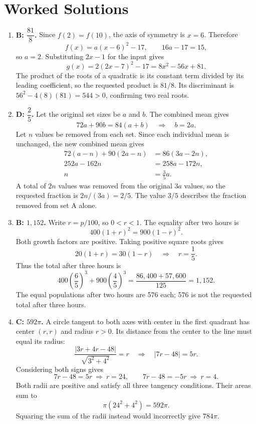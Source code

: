 \documentclass[12pt]{article}
\begin{document}
\section*{Worked Solutions}
\begin{enumerate}[leftmargin=*,itemsep=1em]
  \item \textbf{B: $\dfrac{81}{8}$.} Since $f(2)=f(10)$, the axis of symmetry is $x=6$. Therefore
  \[
    f(x)=a(x-6)^2-17,\qquad 16a-17=15,
  \]
  so $a=2$. Substituting $2x-1$ for the input gives
  \[
    g(x)=2(2x-7)^2-17=8x^2-56x+81.
  \]
  The product of the roots of a quadratic is its constant term divided by its leading coefficient, so the requested product is $\boxed{81/8}$. Its discriminant is $56^2-4(8)(81)=544>0$, confirming two real roots.

  \vfill
  \item \textbf{D: $\dfrac25$.} Let the original set sizes be $a$ and $b$. The combined mean gives
  \[
    72a+90b=84(a+b)\quad\Longrightarrow\quad b=2a.
  \]
  Let $n$ values be removed from each set. Since each individual mean is unchanged, the new combined mean gives
  \begin{align*}
    72(a-n)+90(2a-n)&=86(3a-2n),\\
    252a-162n&=258a-172n,\\
    n&=\frac35a.
  \end{align*}
  A total of $2n$ values was removed from the original $3a$ values, so the requested fraction is $2n/(3a)=\boxed{2/5}$. The value $3/5$ describes the fraction removed from set A alone.

  \vfill
  \newpage
  \item \textbf{B: $1{,}152$.} Write $r=p/100$, so $0<r<1$. The equality after two hours is
  \[
    400(1+r)^2=900(1-r)^2.
  \]
  Both growth factors are positive. Taking positive square roots gives
  \[
    20(1+r)=30(1-r)\quad\Longrightarrow\quad r=\frac15.
  \]
  Thus the total after three hours is
  \[
    400\left(\frac65\right)^3+900\left(\frac45\right)^3
    =\frac{86{,}400+57{,}600}{125}=\boxed{1{,}152}.
  \]
  The equal populations after two hours are 576 each; 576 is not the requested total after three hours.

  \vfill
  \item \textbf{C: $592\pi$.} A circle tangent to both axes with center in the first quadrant has center $(r,r)$ and radius $r>0$. Its distance from the center to the line must equal its radius:
  \[
    \frac{|3r+4r-48|}{\sqrt{3^2+4^2}}=r
    \quad\Longrightarrow\quad |7r-48|=5r.
  \]
  Considering both signs gives
  \[
    7r-48=5r\ \Longrightarrow\ r=24,
    \qquad
    7r-48=-5r\ \Longrightarrow\ r=4.
  \]
  Both radii are positive and satisfy all three tangency conditions. Their areas sum to
  \[
    \pi(24^2+4^2)=\boxed{592\pi}.
  \]
  Squaring the sum of the radii instead would incorrectly give $784\pi$.


\end{enumerate}
\end{document}
